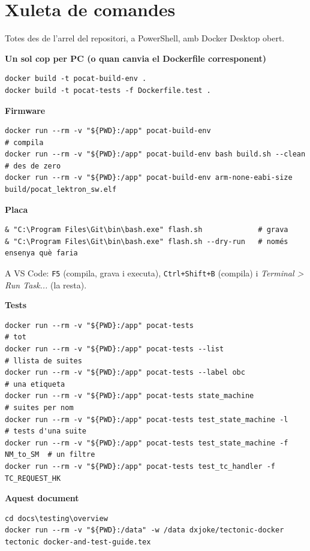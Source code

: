 \documentclass[11pt,a4paper]{article}
\DeclareRobustCommand{\_}{\textunderscore\allowbreak}
\newcommand{\cd}[1]{\texttt{#1}}
\begin{document}
\section{Xuleta de comandes}\label{sec:xuleta}

Totes des de l'arrel del repositori, a PowerShell, amb Docker Desktop obert.

\textbf{Un sol cop per PC (o quan canvia el Dockerfile corresponent)}
\begin{lstlisting}
docker build -t pocat-build-env .
docker build -t pocat-tests -f Dockerfile.test .
\end{lstlisting}

\textbf{Firmware}
\begin{lstlisting}
docker run --rm -v "${PWD}:/app" pocat-build-env                          # compila
docker run --rm -v "${PWD}:/app" pocat-build-env bash build.sh --clean    # des de zero
docker run --rm -v "${PWD}:/app" pocat-build-env arm-none-eabi-size build/pocat_lektron_sw.elf
\end{lstlisting}

\textbf{Placa}
\begin{lstlisting}
& "C:\Program Files\Git\bin\bash.exe" flash.sh             # grava
& "C:\Program Files\Git\bin\bash.exe" flash.sh --dry-run   # només ensenya què faria
\end{lstlisting}
A VS Code: \cd{F5} (compila, grava i executa), \cd{Ctrl+Shift+B} (compila) i
\emph{Terminal > Run Task...} (la resta).

\textbf{Tests}
\begin{lstlisting}
docker run --rm -v "${PWD}:/app" pocat-tests                               # tot
docker run --rm -v "${PWD}:/app" pocat-tests --list                        # llista de suites
docker run --rm -v "${PWD}:/app" pocat-tests --label obc                   # una etiqueta
docker run --rm -v "${PWD}:/app" pocat-tests state_machine                 # suites per nom
docker run --rm -v "${PWD}:/app" pocat-tests test_state_machine -l         # tests d'una suite
docker run --rm -v "${PWD}:/app" pocat-tests test_state_machine -f NM_to_SM  # un filtre
docker run --rm -v "${PWD}:/app" pocat-tests test_tc_handler -f TC_REQUEST_HK
\end{lstlisting}

\textbf{Aquest document}
\begin{lstlisting}
cd docs\testing\overview
docker run --rm -v "${PWD}:/data" -w /data dxjoke/tectonic-docker tectonic docker-and-test-guide.tex
\end{lstlisting}
\end{document}
